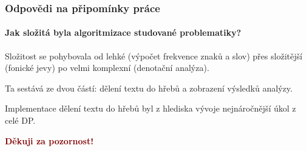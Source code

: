\documentclass[12pt,xcolor=usenames,dvipsnames]{beamer}
\begin{document}
\begin{frame}
	\frametitle{Odpovědi na připomínky práce}
	\framesubtitle{Jak složitá byla algoritmizace studované problematiky?}

	Složitost se pohybovala od lehké (výpočet frekvence znaků a slov) přes složitější (fonické jevy) po velmi komplexní (denotační analýza).

	Ta sestává ze dvou částí: dělení textu do hřebů a zobrazení výsledků analýzy.

	Implementace dělení textu do hřebů byl z hlediska vývoje nejnáročnější úkol  z celé DP.

\end{frame}

\begin{frame}
\begin{block}{}
\begin{center}
\textcolor{Maroon}{\textbf{{\huge Děkuji za pozornost!}}}
\end{center}
\end{block}
\end{frame}
\end{document}
